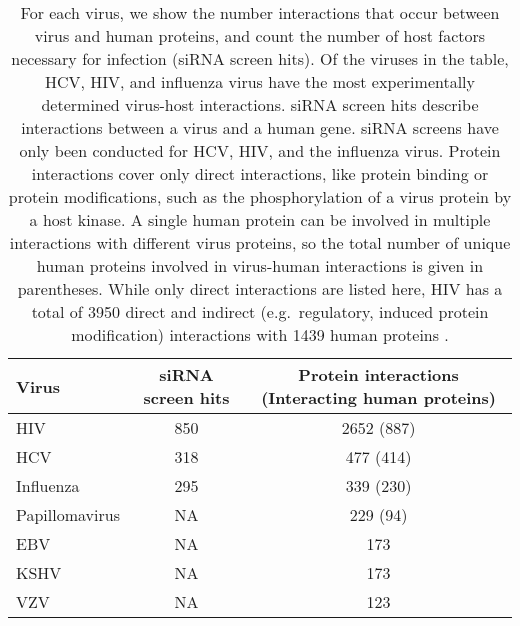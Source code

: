\begin{table}\footnotesize
\begin{center}
  \begin{tabular}{|l|c|c|}
  \hline
  Virus & siRNA screen hits & Protein interactions (Interacting human proteins) \\
  \hline
HIV & 850 & 2652 (887) \\
HCV & 318 & 477 (414) \\
Influenza & 295 & 339 (230) \\
Papillomavirus & NA & 229 (94) \\
EBV & NA & 173 \\
KSHV & NA & 173 \\
VZV & NA & 123 \\
\hline
  \end{tabular}
\end{center}
\caption[Experimentally determined virus-host interactions]{\small For
  each virus, we show the number interactions that occur between virus
  and human proteins, and count the number of host factors necessary
  for infection (siRNA screen hits). Of the viruses in the table, HCV,
  HIV, and influenza virus have the most experimentally determined
  virus-host interactions. siRNA screen hits describe interactions
  between a virus and a human gene. siRNA screens have only been
  conducted for HCV, HIV, and the influenza virus. Protein
  interactions cover only direct interactions, like protein binding or
  protein modifications, such as the phosphorylation of a virus
  protein by a host kinase. A single human protein can be involved in
  multiple interactions with different virus proteins, so the total
  number of unique human proteins involved in virus-human interactions
  is given in parentheses. While only direct interactions are listed
  here, HIV has a total of 3950 direct and indirect (e.g.\ regulatory,
  induced protein modification) interactions with 1439 human proteins
  \cite{fu09}. \label{tbl:intro:counts}}
\end{table}
